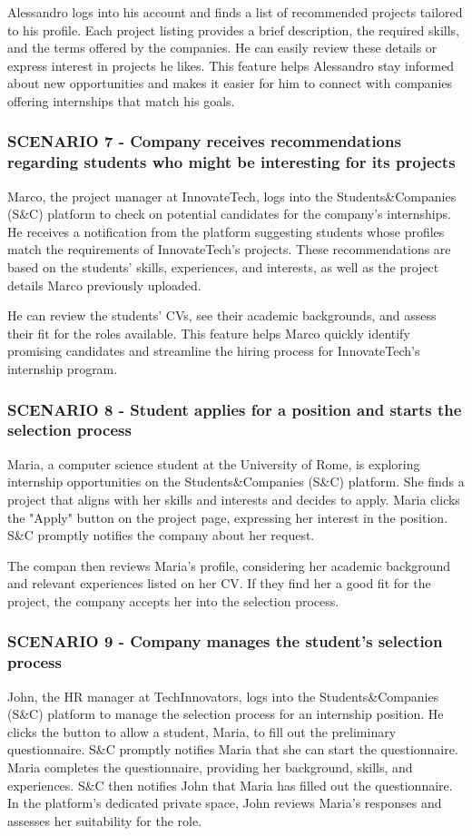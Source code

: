 Alessandro logs into his account and finds a list of recommended projects tailored to his profile.
Each project listing provides a brief description, the required skills, and the terms offered by
the companies. He can easily review these details or express interest in projects he likes.
This feature helps Alessandro stay informed about new opportunities and makes it easier for
him to connect with companies offering internships that match his goals.
\subsubsection{SCENARIO 7 - Company receives recommendations regarding students who might be interesting for its projects}
Marco, the project manager at InnovateTech, logs into the Students\&Companies (S\&C) platform
to check on potential candidates for the company’s internships. He receives a notification
from the platform suggesting students whose profiles match the requirements of InnovateTech’s projects.
These recommendations are based on the students’ skills, experiences, and interests, as well as
the project details Marco previously uploaded.

He can review the students’ CVs, see their academic
backgrounds, and assess their fit for the roles available. This feature helps Marco quickly identify
 promising candidates and streamline the hiring process for InnovateTech’s internship program.
\subsubsection{SCENARIO 8 - Student applies for a position and starts the selection process}
Maria, a computer science student at the University of Rome, is exploring internship opportunities
on the Students\&Companies (S\&C) platform. She finds a project that aligns with her skills and
interests and decides to apply. Maria clicks the "Apply" button on the project page, expressing
her interest in the position. S\&C promptly notifies the company about her request.

The compan then reviews Maria’s profile, considering her academic background and relevant
experiences listed on her CV. If they find her a good fit for the project, the company accepts
her into the selection process.
\subsubsection{SCENARIO 9 - Company manages the student's selection process}
John, the HR manager at TechInnovators, logs into the Students\&Companies (S\&C) platform
to manage the selection process for an internship position. He clicks the button to allow a student,
Maria, to fill out the preliminary questionnaire. S\&C promptly notifies Maria that she can start
the questionnaire. Maria completes the questionnaire, providing her background, skills, and experiences.
S\&C then notifies John that Maria has filled out the questionnaire. In the platform’s dedicated
private space, John reviews Maria’s responses and assesses her suitability for the role.

